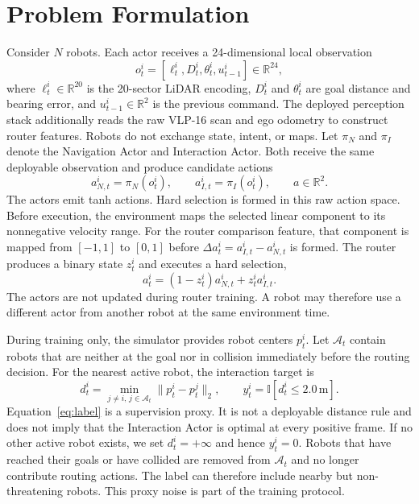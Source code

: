 \documentclass[letterpaper,10pt,conference]{ieeeconf}
\begin{document}
\section{Problem Formulation}
Consider $N$ robots. Each actor receives a 24-dimensional local observation
\begin{equation}
 o_t^i=[\ell_t^i,D_t^i,\theta_t^i,u_{t-1}^i]\in\mathbb{R}^{24},
\end{equation}
where $\ell_t^i\in\mathbb{R}^{20}$ is the 20-sector LiDAR encoding, $D_t^i$ and $\theta_t^i$ are goal distance and bearing error, and $u_{t-1}^i\in\mathbb{R}^{2}$ is the previous command. The deployed perception stack additionally reads the raw VLP-16 scan and ego odometry to construct router features. Robots do not exchange state, intent, or maps. Let $\pi_N$ and $\pi_I$ denote the Navigation Actor and Interaction Actor. Both receive the same deployable observation and produce candidate actions
\begin{equation}
 a_{N,t}^i=\pi_N(o_t^i),\qquad a_{I,t}^i=\pi_I(o_t^i),\qquad a\in\mathbb{R}^{2}.
\end{equation}
The actors emit tanh actions. Hard selection is formed in this raw action space. Before execution, the environment maps the selected linear component to its nonnegative velocity range. For the router comparison feature, that component is mapped from $[-1,1]$ to $[0,1]$ before $\Delta a_t^i=a_{I,t}^i-a_{N,t}^i$ is formed.
The router produces a binary state $z_t^i$ and executes a hard selection,
\begin{equation}
 a_t^i=(1-z_t^i)a_{N,t}^i+z_t^i a_{I,t}^i.
 \label{eq:hardroute}
\end{equation}
The actors are not updated during router training. A robot may therefore use a different actor from another robot at the same environment time.

During training only, the simulator provides robot centers $p_t^i$. Let $\mathcal{A}_t$ contain robots that are neither at the goal nor in collision immediately before the routing decision. For the nearest active robot, the interaction target is
\begin{equation}
 d_t^i=\min_{j\neq i,\,j\in\mathcal{A}_t}\|p_t^i-p_t^j\|_2,\qquad y_t^i=\mathbb{I}[d_t^i\leq 2.0\,\mathrm{m}].
 \label{eq:label}
\end{equation}
Equation~\eqref{eq:label} is a supervision proxy. It is not a deployable distance rule and does not imply that the Interaction Actor is optimal at every positive frame. If no other active robot exists, we set $d_t^i=+\infty$ and hence $y_t^i=0$. Robots that have reached their goals or have collided are removed from $\mathcal{A}_t$ and no longer contribute routing actions. The label can therefore include nearby but non-threatening robots. This proxy noise is part of the training protocol.
\end{document}
